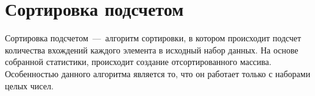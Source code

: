 \section{Сортировка подсчетом}
Сортировка подсчетом~---~алгоритм сортировки, в котором происходит подсчет количества вхождений каждого элемента в исходный набор данных. 
На основе собранной статистики, происходит создание отсортированного массива. 
Особенностью данного алгоритма является то, что он работает только с наборами целых чисел.

\newpage